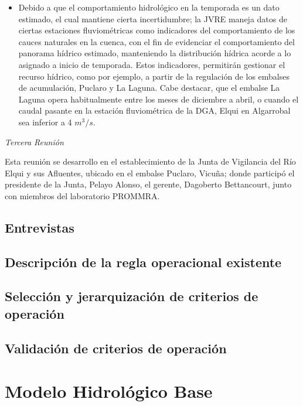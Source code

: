 \documentclass[11pt,]{article}
\begin{document}
\begin{itemize}
		\item Debido a que el comportamiento hidrológico en la temporada es un dato estimado, el cual mantiene cierta incertidumbre; la JVRE maneja datos de ciertas estaciones fluviométricas como indicadores del comportamiento de los cauces naturales en la cuenca, con el fin de evidenciar el comportamiento del panorama hídrico estimado, manteniendo la distribución hídrica acorde a lo asignado a inicio de temporada. Estos indicadores, permitirán gestionar el recurso hídrico, como por ejemplo, a partir de la regulación de los embalses de acumulación, Puclaro y La Laguna. Cabe destacar, que el embalse La Laguna opera habitualmente entre los meses de diciembre a abril, o cuando el caudal pasante en la estación fluviométrica de la DGA, Elqui en Algarrobal sea inferior a 4 $ m^3/s$.
		
		\end{itemize}		\bigskip
		
		\textit {Tercera Reunión}\bigskip
		
	Esta reunión se desarrollo en el establecimiento de la Junta de Vigilancia del Río Elqui y sus Afluentes, ubicado en el embalse Puclaro, Vicuña; donde participó el presidente de la Junta, Pelayo Alonso, el gerente, Dagoberto Bettancourt, junto con miembros del laboratorio PROMMRA. 
		
		
		\subsection{Entrevistas}\bigskip
		
		\subsection{Descripción de la regla operacional existente}\bigskip
		
			\subsection{Selección y jerarquización de criterios de operación}\bigskip
			
			\subsection{Validación de criterios de operación}\bigskip

\section{Modelo Hidrológico Base}\bigskip
\end{document}
